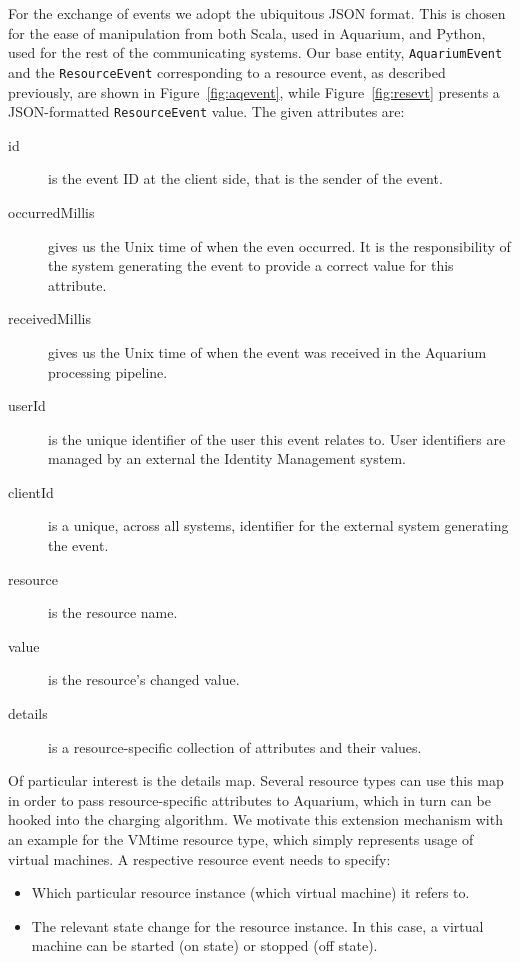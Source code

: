 \documentclass[preprint,10pt]{sigplanconf}
\begin{document}
For the exchange of events we adopt the ubiquitous JSON format. This is chosen for the ease of manipulation from both Scala, used in Aquarium, and Python, used for the rest of the communicating systems. Our base entity, \texttt{AquariumEvent} and the \texttt{ResourceEvent} corresponding to a resource event, as described previously, are shown in Figure~\ref{fig:aqevent}, while Figure~\ref{fig:resevt} presents a JSON-formatted \texttt{ResourceEvent} value. The given attributes are:

\begin{description}
\item[id] is the event \textsf{ID} at the client side, that is the sender of the event. 

\item[occurredMillis] gives us the Unix time of when the even occurred. It is the responsibility of the system generating the event to provide a correct value for this attribute.

\item[receivedMillis] gives us the Unix time of when the event was received in the Aquarium processing pipeline.

\item[userId] is the unique identifier of the user this event relates to. User identifiers are managed by an external the Identity Management system.

\item[clientId] is a unique, across all systems, identifier for the external system generating the event.

\item[resource] is the resource name.

\item[value] is the resource's changed value.

\item[details] is a resource-specific collection of  attributes and their values.
\end{description}

Of particular interest is the \textsf{details} map. Several resource types can use this map in order to pass resource-specific attributes to Aquarium, which in turn can be hooked into the charging algorithm. We motivate this extension mechanism with an example for the \textsf{VMtime} resource type, which simply represents usage of virtual machines. A respective resource event needs to specify:
\begin{itemize}
\item Which particular resource instance (which virtual machine) it refers to.
\item The relevant state change for the resource instance. In this case, a virtual machine can be started (\textsf{on} state) or stopped (\textsf{off} state).
\end{itemize}
\end{document}
